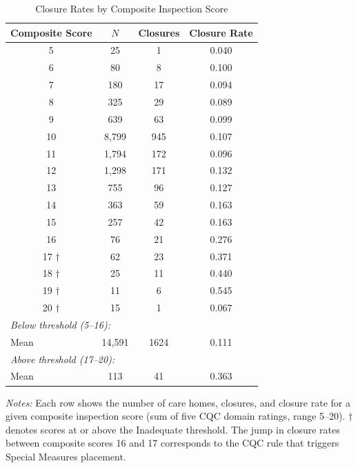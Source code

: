 \begin{table}[t]
\centering
\begin{threeparttable}
\caption{Closure Rates by Composite Inspection Score}
\label{tab:scores}
\begin{tabular}{cccc}
\toprule
Composite Score & $N$ & Closures & Closure Rate \\
\midrule
5 & 25 & 1 & 0.040 \\
6 & 80 & 8 & 0.100 \\
7 & 180 & 17 & 0.094 \\
8 & 325 & 29 & 0.089 \\
9 & 639 & 63 & 0.099 \\
10 & 8,799 & 945 & 0.107 \\
11 & 1,794 & 172 & 0.096 \\
12 & 1,298 & 171 & 0.132 \\
13 & 755 & 96 & 0.127 \\
14 & 363 & 59 & 0.163 \\
15 & 257 & 42 & 0.163 \\
16 & 76 & 21 & 0.276 \\
17 $\dagger$ & 62 & 23 & 0.371 \\
18 $\dagger$ & 25 & 11 & 0.440 \\
19 $\dagger$ & 11 & 6 & 0.545 \\
20 $\dagger$ & 15 & 1 & 0.067 \\
\midrule
\multicolumn{4}{l}{\textit{Below threshold (5--16):}} \\
\multicolumn{1}{l}{\quad Mean} & 14,591 & 1624 & 0.111 \\
\multicolumn{4}{l}{\textit{Above threshold (17--20):}} \\
\multicolumn{1}{l}{\quad Mean} & 113 & 41 & 0.363 \\
\bottomrule
\end{tabular}
\begin{tablenotes}[flushleft]
\small
\item \textit{Notes:} Each row shows the number of care homes, closures, and closure rate for a given composite inspection score (sum of five CQC domain ratings, range 5--20). $\dagger$ denotes scores at or above the Inadequate threshold. The jump in closure rates between composite scores 16 and 17 corresponds to the CQC rule that triggers Special Measures placement.
\end{tablenotes}
\end{threeparttable}
\end{table}
